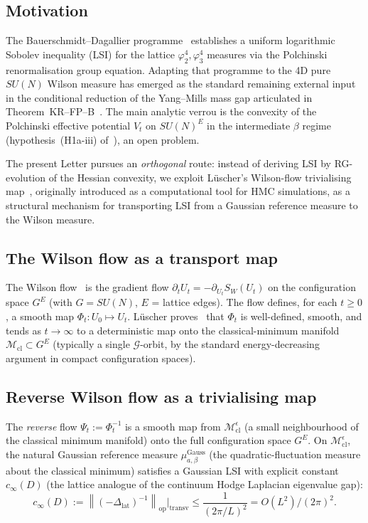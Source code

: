 \documentclass[11pt,a4paper]{amsart}
\theoremstyle{definition}
\newcommand{\norm}[1]{\left\lVert#1\right\rVert}
\begin{document}
\subsection{Motivation}
The Bauerschmidt--Dagallier programme~\cite{BauerschmidtDagallier2024}
establishes a uniform logarithmic Sobolev inequality (LSI) for the
lattice $\varphi^4_2,\varphi^4_3$ measures via the Polchinski
renormalisation group equation. Adapting that programme to the 4D pure
$SU(N)$ Wilson measure has emerged as the standard remaining external
input in the conditional reduction of the Yang--Mills mass gap
articulated in Theorem~KR--FP--B~\cite{RemondiereKRFPB_2026}. The main
analytic verrou is the convexity of the Polchinski effective potential
$V_t$ on $SU(N)^E$ in the intermediate $\beta$ regime
(hypothesis~(H1a-iii) of~\cite{OpusPolchinskiSubgaps2026}), an open
problem.

The present Letter pursues an \emph{orthogonal} route: instead of
deriving LSI by RG-evolution of the Hessian convexity, we exploit
L\"uscher's Wilson-flow trivialising map~\cite{Luscher2009TrivializingMaps,
Luscher2010WilsonFlow}, originally introduced as a computational tool
for HMC simulations, as a structural mechanism for transporting LSI from
a Gaussian reference measure to the Wilson measure.

\subsection{The Wilson flow as a transport map}
The Wilson flow~\cite{Luscher2009TrivializingMaps} is the gradient flow
$\partial_t U_t = -\partial_{U_t} S_W(U_t)$ on the configuration space
$G^E$ (with $G = SU(N)$, $E$ = lattice edges). The flow defines, for
each $t\geq 0$, a smooth map $\Phi_t : U_0 \mapsto U_t$. L\"uscher
proves~\cite[\S 2]{Luscher2010WilsonFlow} that $\Phi_t$ is well-defined,
smooth, and tends as $t\to\infty$ to a deterministic map onto the
classical-minimum manifold $\mathcal M_\mathrm{cl}\subset G^E$
(typically a single $\mathcal G$-orbit, by the standard energy-decreasing
argument in compact configuration spaces).

\subsection{Reverse Wilson flow as a trivialising map}
The \emph{reverse} flow $\Psi_t := \Phi_t^{-1}$ is a smooth map from
$\mathcal M_\mathrm{cl}^\epsilon$ (a small neighbourhood of the
classical minimum manifold) onto the full configuration space $G^E$.
On $\mathcal M_\mathrm{cl}^\epsilon$, the natural Gaussian reference
measure $\mu^\mathrm{Gauss}_{a,\beta}$ (the quadratic-fluctuation
measure about the classical minimum) satisfies a Gaussian LSI with
explicit constant $c_\infty(D)$ (the lattice analogue of the
continuum Hodge Laplacian eigenvalue gap):
\begin{equation}\label{eq:cinfty}
c_\infty(D) := \norm{(-\Delta_\mathrm{lat})^{-1}}_\mathrm{op}\big|_\mathrm{transv}
\leq \frac{1}{(2\pi/L)^2} = O(L^2)/(2\pi)^2.
\end{equation}
\end{document}
